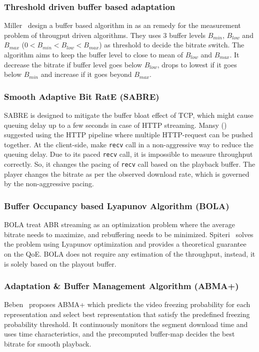 \subsubsection{Threshold driven buffer based adaptation}
Miller \etal\ design a buffer based algorithm in \cite{6229732} as an remedy for the measurement problem of througput driven algorithms. They uses 3 buffer levels $B_{min}$, $B_{low}$ and $B_{max}$ ($0 < B_{min} < B_{low} < B_{max}$) as threshold to decide the bitrate switch. The algorithm aims to keep the buffer level to close to mean of $B_{low}$ and $B_{max}$. It decrease the bitrate if buffer level goes below $B_{low}$, drops to lowest if it goes below $B_{min}$ and increase if it goes beyond $B_{max}$.

\subsubsection{Smooth Adaptive Bit RatE (SABRE)}
SABRE is designed to mitigate the buffer bloat effect of TCP, which might cause queuing delay up to a few seconds in case of HTTP streaming. Mansy \etal(\cite{10.1145/2483977.2484004}) suggested using the HTTP pipeline where multiple HTTP-request can be pushed together. At the client-side, make {\tt recv} call in a non-aggressive way to reduce the queuing delay. Due to its paced {\tt recv} call, it is impossible to measure throughput correctly. So, it changes the pacing of {\tt recv} call based on the playback buffer. The player changes the bitrate as per the observed download rate, which is governed by the non-aggressive pacing.

\subsubsection{Buffer Occupancy based Lyapunov Algorithm (BOLA)}
BOLA\cite{Spiteri2016} treat ABR streaming as an optimization problem where the average bitrate needs to maximize, and rebuffering needs to be minimized. Spiteri \etal\ solves the problem using Lyapunov optimization and provides a theoretical guarantee on the QoE. BOLA does not require any estimation of the throughput, instead, it is solely based on the playout buffer.

\subsubsection{Adaptation \& Buffer Management Algorithm (ABMA+)}
Beben \etal\ proposes ABMA+\cite{10.1145/2910017.2910596} which predicts the video freezing probability for each representation and select best representation that satisfy the predefined freezing probability threshold. It continuously monitors the segment download time and uses time characteristics, and the precomputed buffer-map decides the best bitrate for smooth playback.

